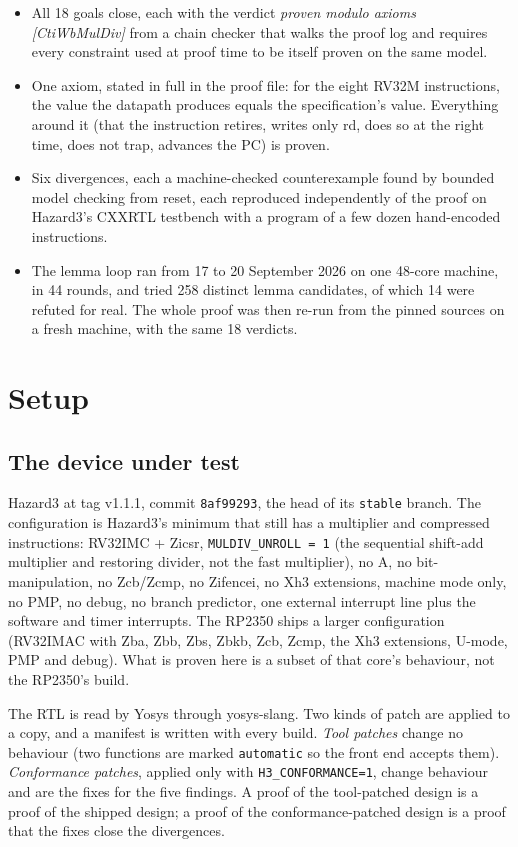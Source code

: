 \documentclass[11pt]{article}
\newcommand{\code}[1]{\texttt{#1}}
\begin{document}
\begin{itemize}
\item All 18 goals close, each with the verdict \emph{proven modulo axioms
  [CtiWbMulDiv]} from a chain checker that walks the proof log and requires
  every constraint used at proof time to be itself proven on the same model.
\item One axiom, stated in full in the proof file: for the eight RV32M
  instructions, the value the datapath produces equals the specification's
  value. Everything around it (that the instruction retires, writes only rd,
  does so at the right time, does not trap, advances the PC) is proven.
\item Six divergences, each a machine-checked counterexample found by bounded
  model checking from reset, each reproduced independently of the proof on
  Hazard3's CXXRTL testbench with a program of a few dozen hand-encoded
  instructions.
\item The lemma loop ran from 17 to 20 September 2026 on one 48-core machine,
  in 44 rounds, and tried 258 distinct lemma candidates, of which 14 were
  refuted for real. The whole proof was then re-run from the pinned sources on
  a fresh machine, with the same 18 verdicts.
\end{itemize}

\section{Setup}

\subsection{The device under test}
\label{sec:dut}

Hazard3 at tag v1.1.1, commit \code{8af99293}, the head of its \code{stable}
branch. The configuration is Hazard3's minimum that still has a multiplier and
compressed instructions: RV32IMC + Zicsr, \code{MULDIV\_UNROLL = 1}
(the sequential shift-add multiplier and restoring divider, not the fast
multiplier), no A, no bit-manipulation, no Zcb/Zcmp, no Zifencei, no Xh3
extensions, machine mode only, no PMP, no debug, no branch predictor, one
external interrupt line plus the software and timer interrupts. The RP2350
ships a larger configuration (RV32IMAC with Zba, Zbb, Zbs, Zbkb, Zcb, Zcmp, the
Xh3 extensions, U-mode, PMP and debug). What is proven here is a subset of
that core's behaviour, not the RP2350's build.

The RTL is read by Yosys through yosys-slang. Two kinds of patch are applied to
a copy, and a manifest is written with every build. \emph{Tool patches} change
no behaviour (two functions are marked \code{automatic} so the front end accepts
them). \emph{Conformance patches}, applied only with \code{H3\_CONFORMANCE=1},
change behaviour and are the fixes for the five findings. A proof of the
tool-patched design is a proof of the shipped design; a proof of the
conformance-patched design is a proof that the fixes close the divergences.
\end{document}
